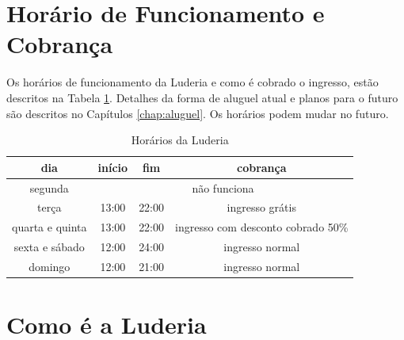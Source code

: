\section{Horário de Funcionamento e Cobrança}

Os horários de funcionamento da Luderia e como é cobrado o ingresso, estão descritos na Tabela \ref{tab:ludehorarios}. Detalhes da forma de aluguel atual e planos para o futuro são descritos no Capítulos \ref{chap:aluguel}. Os horários podem mudar no futuro.

\begin{table}[hbt]
    \centering
    \begin{tabular}{cccc}
    \toprule
    dia & início & fim & cobrança\\
    \midrule
        segunda & \multicolumn{3}{c}{não funciona} \\
         terça & 13:00 & 22:00 & ingresso grátis \\
         quarta e quinta & 13:00 & 22:00 & ingresso com desconto cobrado 50\%\\
         sexta e sábado & 12:00 & 24:00 & ingresso normal \\
         domingo & 12:00 & 21:00 & ingresso normal \\
    \bottomrule
    \end{tabular}
    \caption{Horários da Luderia}
    \label{tab:ludehorarios}
\end{table}

\section{Como é a Luderia}


